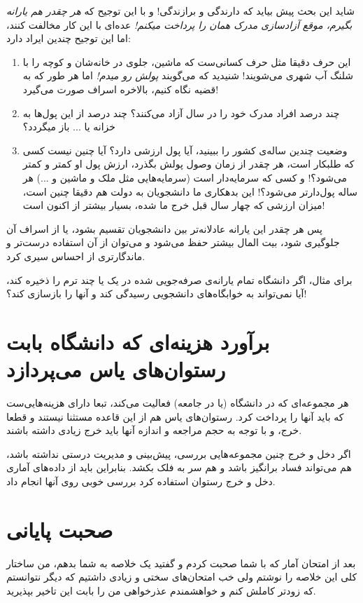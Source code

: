 \documentclass{article}
\begin{document}
		شاید این بحث پیش‌ بیاید که دارندگی و برازندگی! و با این توجیح که \textit{هر چقدر هم یارانه بگیرم، موقع آزادسازی مدرک همان را پرداخت میکنم!} عده‌ای با این کار مخالفت کنند، اما این توجیح چندین ایراد دارد:
		\begin{enumerate}
			\item 
			این حرف دقیقا مثل حرف کسانی‌ست که ماشین، جلوی در خانه‌‌شان و کوچه را با شلنگ آب شهری می‌شویند! شنیدید که می‌گویند \textit{پولش رو میدم!} اما هر طور که به قضیه نگاه کنیم، بالاخره اسراف صورت می‌گیرد!
			\item 
			چند درصد افراد مدرک خود را در سال آزاد می‌کنند؟ چند درصد از این پول‌ها به خزانه یا ... باز میگردد؟
			\item 
			وضعیت چندین ساله‌ی کشور را ببینید، آیا پول ارزشی دارد؟ آیا چنین نیست کسی که طلبکار است، هر چقدر از زمان وصول پولش بگذرد، ارزش پول او کمتر و کمتر می‌شود؟! و کسی که سرمایه‌دار است (سرمایه‌هایی مثل ملک و ماشین و ...) هر ساله پول‌دارتر می‌شود؟!
			این بدهکاری ما دانشجویان به دولت هم دقیقا چنین است، میزان ارزشی که چهار سال قبل خرج ما شده، بسیار بیشتر از اکنون است!
		\end{enumerate}
	پس هر چقدر این یارانه عادلانه‌تر بین دانشجویان تقسیم بشود، یا از اسراف آن جلوگیری شود، بیت المال بیشتر حفظ می‌شود و می‌توان از آن استفاده درست‌تر و ماندگارتری از احساس سیری کرد.
	
	برای مثال، اگر دانشگاه تمام یارانه‌ی صرفه‌جویی شده در یک یا چند ترم را ذخیره کند، آیا نمی‌تواند به خوابگاه‌های دانشجویی رسیدگی کند و آنها را بازسازی کند؟!
	
	\section{برآورد هزینه‌ای که دانشگاه بابت رستوان‌های یاس می‌پردازد}
		هر مجموعه‌ای که در دانشگاه (یا در جامعه) فعالیت می‌کند، تبعا دارای هزینه‌هایی‌ست که باید آنها را پرداخت کرد. رستوان‌های یاس هم از این قاعده مستثنا نیستند و قطعا خرج، و با توجه به حجم مراجعه و اندازه‌ آنها باید خرج زیادی داشته باشند.
		
		اگر دخل و خرج چنین مجموعه‌هایی بررسی، پیش‌بینی و مدیریت درستی نداشته باشد، هم می‌تواند فساد برانگیز باشد و هم سر به فلک بکشد. بنابراین باید از داده‌های آماری دخل و خرج رستوان استفاده کرد بررسی خوبی روی آنها انجام داد.
		
	\section*{صحبت پایانی}
		بعد از امتحان آمار که با شما صحبت کردم و گفتید یک خلاصه به شما بدهم، من ساختار کلی این خلاصه را نوشتم ولی خب امتحان‌های سختی و زیادی داشتیم که دیگر نتوانستم که زودتر کاملش کنم و خواهشمندم عذرخواهی من را بابت این تاخیر بپذیرید.
\end{document}
